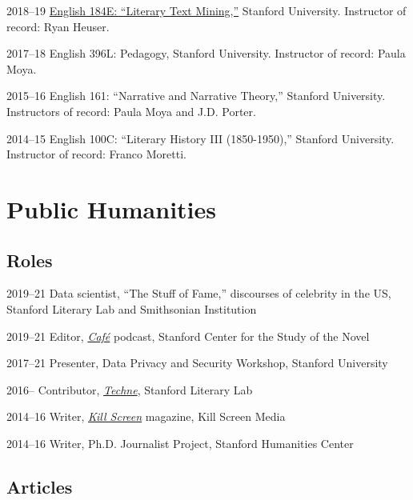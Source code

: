 \documentclass[12pt,letterpaper]{report}
\begin{document}
\begin{tablist}
	\item[2018--19] \tab{}\href{https://fredner.org/teaching}{English 184E: \enquote{Literary Text Mining,}} Stanford University. Instructor of record: Ryan Heuser.
	\item[2017--18] \tab{}English 396L: Pedagogy, Stanford University. Instructor of record: Paula Moya.
	\item[2015--16] \tab{}English 161: \enquote{Narrative and Narrative Theory,} Stanford University. Instructors of record: Paula Moya and J.D. Porter.
	\item[2014--15] \tab{}English 100C: \enquote{Literary History III (1850-1950),} Stanford University. Instructor of record: Franco Moretti.
\end{tablist}

\section*{Public Humanities}

\subsection*{Roles}

\begin{tablist}
	\item[2019--21] \tab{}Data scientist, \enquote{The Stuff of Fame,} discourses of celebrity in the US, Stanford Literary Lab and Smithsonian Institution
	\item[2019--21] \tab{}Editor, \href{https://novel.stanford.edu/csn-cafe}{\emph{Café}} podcast, Stanford Center for the Study of the Novel
	\item[2017--21] \tab{}Presenter, Data Privacy and Security Workshop, Stanford University
	\item[2016--] \tab{}Contributor, \href{https://litlab.stanford.edu/techne/}{\emph{Techne}}, Stanford Literary Lab
	\item[2014--16] \tab{}Writer, \href{https://web.archive.org/web/20221003115514/https://killscreen.com/previously/author/erik-fredner/}{\emph{Kill Screen}} magazine, Kill Screen Media
	\item[2014--16] \tab{}Writer, Ph.D. Journalist Project, Stanford Humanities Center
\end{tablist}

\subsection*{Articles}
\end{document}
